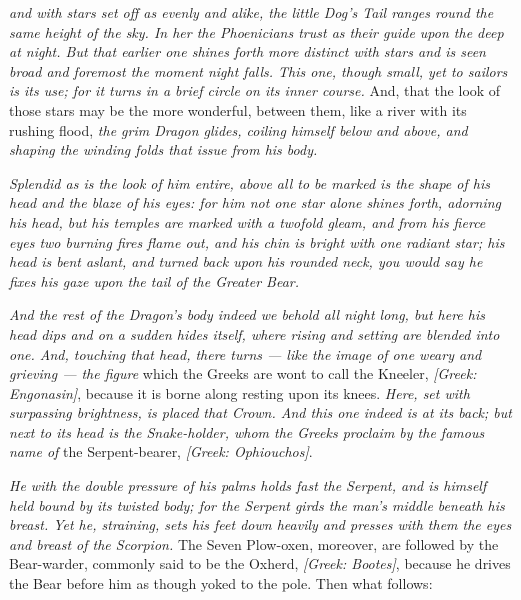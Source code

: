  \textit{and with stars set off as evenly and alike, the little Dog's Tail ranges round the same height of the sky. In her the Phoenicians trust as their guide upon the deep at night. But that earlier one shines forth more distinct with stars and is seen broad and foremost the moment night falls. This one, though small, yet to sailors is its use; for it turns in a brief circle on its inner course.} And, that the look of those stars may be the more wonderful, between them, like a river with its rushing flood, \textit{the grim Dragon glides, coiling himself below and above, and shaping the winding folds that issue from his body.}

 \textit{Splendid as is the look of him entire, above all to be marked is the shape of his head and the blaze of his eyes: for him not one star alone shines forth, adorning his head, but his temples are marked with a twofold gleam, and from his fierce eyes two burning fires flame out, and his chin is bright with one radiant star; his head is bent aslant, and turned back upon his rounded neck, you would say he fixes his gaze upon the tail of the Greater Bear.}

 \textit{And the rest of the Dragon's body indeed we behold all night long, but here his head dips and on a sudden hides itself, where rising and setting are blended into one. And, touching that head, there turns — like the image of one weary and grieving — the figure} which the Greeks are wont to call the Kneeler, \textit{[Greek: Engonasin]}, because it is borne along resting upon its knees. \textit{Here, set with surpassing brightness, is placed that Crown. And this one indeed is at its back; but next to its head is the Snake-holder, whom the Greeks proclaim by the famous name of} the Serpent-bearer, \textit{[Greek: Ophiouchos]}.

 \textit{He with the double pressure of his palms holds fast the Serpent, and is himself held bound by its twisted body; for the Serpent girds the man's middle beneath his breast. Yet he, straining, sets his feet down heavily and presses with them the eyes and breast of the Scorpion.} The Seven Plow-oxen, moreover, are followed by the Bear-warder, commonly said to be the Oxherd, \textit{[Greek: Bootes]}, because he drives the Bear before him as though yoked to the pole. Then what follows:


